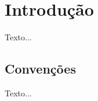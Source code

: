\section{Introdução}
\label{sec:introdução}
Texto...


\subsection{Convenções}
\label{sub:convenções}
Texto...